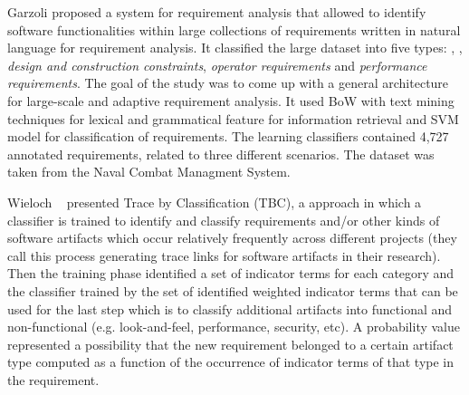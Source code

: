 	Garzoli \cite {Garzoli:2013} proposed a system for requirement analysis that allowed to identify software functionalities within large collections of requirements written in natural language for requirement analysis. It classified the large dataset into five types:
\FR, \NFR, \emph{design and construction constraints}, \emph{operator
requirements} and \emph{performance requirements}.  The goal of the study was to come up with a general
architecture for large-scale and adaptive requirement analysis. It used BoW with text mining techniques for lexical and grammatical feature for information retrieval and SVM model for classification of requirements. The learning classifiers contained 4,727 annotated requirements, related
to three different scenarios. The dataset was taken from
the Naval Combat Managment System.

	Wieloch \etal~\cite{Wieloch:2013} presented Trace by Classification
(TBC), a \ML approach in which a classifier is trained to identify
and classify requirements and/or other kinds of software artifacts which occur
relatively frequently across different projects (they call this process
generating trace links for software artifacts in their research). Then the training phase identified a set of indicator
terms for each \NFR category and the classifier trained by the
set of identified weighted indicator terms that can be used for the last step which is to classify additional
artifacts into functional and non-functional (e.g.
look-and-feel, performance, security, etc). A probability value represented 
a possibility that the new requirement belonged to a certain artifact type computed as a function of the occurrence of indicator terms of that type in the requirement. 
 

